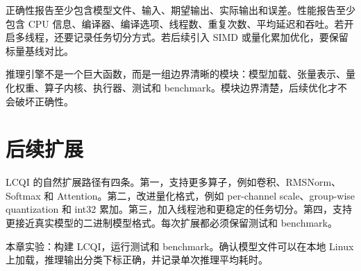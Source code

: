 正确性报告至少包含模型文件、输入、期望输出、实际输出和误差。性能报告至少包含 CPU 信息、编译器、编译选项、线程数、重复次数、平均延迟和吞吐。若开启多线程，还要记录任务切分方式。若后续引入 SIMD 或量化累加优化，要保留标量基线对比。

\begin{keyidea}
推理引擎不是一个巨大函数，而是一组边界清晰的模块：模型加载、张量表示、量化权重、算子内核、执行器、测试和 benchmark。模块边界清楚，后续优化才不会破坏正确性。
\end{keyidea}

\section{后续扩展}

LCQI 的自然扩展路径有四条。第一，支持更多算子，例如卷积、RMSNorm、Softmax 和 Attention。第二，改进量化格式，例如 per-channel scale、group-wise quantization 和 int32 累加。第三，加入线程池和更稳定的任务切分。第四，支持更接近真实模型的二进制模型格式。每次扩展都必须保留测试和 benchmark。

\begin{labbox}
本章实验：构建 LCQI，运行测试和 benchmark。确认模型文件可以在本地 Linux 上加载，推理输出分类下标正确，并记录单次推理平均耗时。
\end{labbox}
